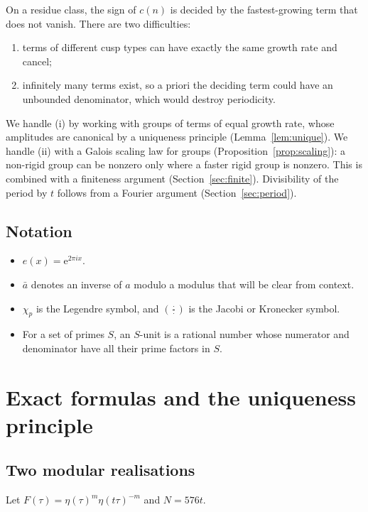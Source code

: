 \documentclass[11pt]{amsart}
\theoremstyle{definition}\newtheorem{definition}[theorem]{Definition}
\theoremstyle{remark}\newtheorem{remark}[theorem]{Remark}
\newcommand{\e}{\mathrm e}\newcommand{\Z}{\mathbb Z}\newcommand{\Q}{\mathbb Q}\newcommand{\C}{\mathbb C}
\begin{document}
On a residue class, the sign of $c(n)$ is decided by the fastest-growing term that does not vanish. There are two difficulties:
\begin{enumerate}[label=(\roman*),leftmargin=2em]
\item terms of different cusp types can have exactly the same growth rate and cancel;
\item infinitely many terms exist, so a priori the deciding term could have an unbounded denominator, which would destroy periodicity.
\end{enumerate}
We handle (i) by working with groups of terms of equal growth rate, whose amplitudes are canonical by a uniqueness principle (Lemma~\ref{lem:unique}). We handle (ii) with a Galois scaling law for groups (Proposition~\ref{prop:scaling}): a non-rigid group can be nonzero only where a faster rigid group is nonzero. This is combined with a finiteness argument (Section~\ref{sec:finite}). Divisibility of the period by $t$ follows from a Fourier argument (Section~\ref{sec:period}).

\subsection*{Notation}
\begin{itemize}[leftmargin=1.5em]
\item $e(x)=\e^{2\pi ix}$.
\item $\bar a$ denotes an inverse of $a$ modulo a modulus that will be clear from context.
\item $\chi_p$ is the Legendre symbol, and $(\tfrac\cdot\cdot)$ is the Jacobi or Kronecker symbol.
\item For a set of primes $S$, an $S$-unit is a rational number whose numerator and denominator have all their prime factors in $S$.
\end{itemize}

\section{Exact formulas and the uniqueness principle}\label{sec:exact}
\subsection{Two modular realisations}
Let $F(\tau)=\eta(\tau)^m\eta(t\tau)^{-m}$ and $N=576t$.
\end{document}
